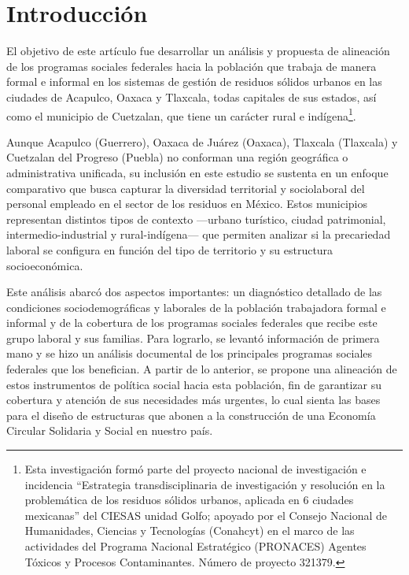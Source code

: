 \documentclass[
  spanish,
  11pt,
  a4paper,
]{scrbook}
\begin{document}
\section*{Introducción}\label{introducciuxf3n-1}


El objetivo de este artículo fue desarrollar un análisis y propuesta de
alineación de los programas sociales federales hacia la población que
trabaja de manera formal e informal en los sistemas de gestión de
residuos sólidos urbanos en las ciudades de Acapulco, Oaxaca y Tlaxcala,
todas capitales de sus estados, así como el municipio de Cuetzalan, que
tiene un carácter rural e indígena\footnote{Esta investigación formó
  parte del proyecto nacional de investigación e incidencia ``Estrategia
  transdisciplinaria de investigación y resolución en la problemática de
  los residuos sólidos urbanos, aplicada en 6 ciudades mexicanas'' del
  CIESAS unidad Golfo; apoyado por el Consejo Nacional de Humanidades,
  Ciencias y Tecnologías (Conahcyt) en el marco de las actividades del
  Programa Nacional Estratégico (PRONACES) Agentes Tóxicos y Procesos
  Contaminantes. Número de proyecto 321379.}.

Aunque Acapulco (Guerrero), Oaxaca de Juárez (Oaxaca), Tlaxcala
(Tlaxcala) y Cuetzalan del Progreso (Puebla) no conforman una región
geográfica o administrativa unificada, su inclusión en este estudio se
sustenta en un enfoque comparativo que busca capturar la diversidad
territorial y sociolaboral del personal empleado en el sector de los
residuos en México. Estos municipios representan distintos tipos de
contexto ---urbano turístico, ciudad patrimonial, intermedio-industrial
y rural-indígena--- que permiten analizar si la precariedad laboral se
configura en función del tipo de territorio y su estructura
socioeconómica.

Este análisis abarcó dos aspectos importantes: un diagnóstico detallado
de las condiciones sociodemográficas y laborales de la población
trabajadora formal e informal y de la cobertura de los programas
sociales federales que recibe este grupo laboral y sus familias. Para
lograrlo, se levantó información de primera mano y se hizo un análisis
documental de los principales programas sociales federales que los
benefician. A partir de lo anterior, se propone una alineación de estos
instrumentos de política social hacia esta población, fin de garantizar
su cobertura y atención de sus necesidades más urgentes, lo cual sienta
las bases para el diseño de estructuras que abonen a la construcción de
una Economía Circular Solidaria y Social en nuestro país.
\end{document}
